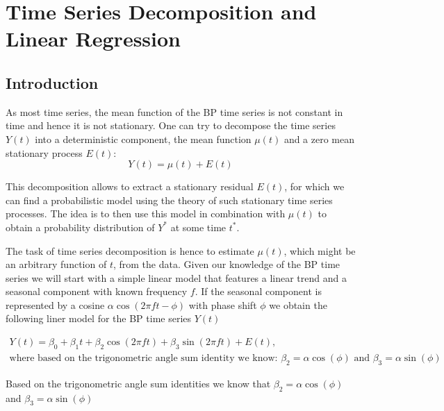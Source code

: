 

\chapter{Time Series Decomposition and Linear Regression}\label{ch:time-series-decomposition-and-regression}


\section{Introduction}

As most time series, the mean function of the BP time series is not constant in time and hence it is not stationary.
One can try to decompose the time series $Y(t)$ into a deterministic component, the mean function $\mu(t)$
and a zero mean stationary process $E(t)$:
\[ Y(t)= \mu(t) + E(t) \]

This decomposition allows to extract a stationary residual $E(t)$, for which we can find a probabilistic model
using the theory of such stationary time series processes. The idea is to then use this model in combination
with $\mu(t)$ to obtain a probability distribution of $Y^{\ast}$ at some time $t^{\ast}$.

The task of time series decomposition is hence to estimate $\mu(t)$, which might be an arbitrary function of $t$, from the data.
Given our knowledge of the BP time series we will start with a simple linear model that
features a linear trend and a seasonal component with known frequency $f$.
If the seasonal component is represented by a cosine $\alpha \cos(2 \pi f t - \phi)$ with phase shift $\phi$ we obtain the
following liner model for the BP time series $Y(t)$

\begin{gather*}
Y(t) = \beta_0 + \beta_1 t + \beta_2 \cos(2 \pi f t) + \beta_3 \sin(2 \pi f t) + E(t), \\
\text{where based on the trigonometric angle sum identity we know: $\beta_2 = \alpha \cos(\phi)$ and $\beta_3 = \alpha \sin(\phi)$}
\end{gather*}

Based on the trigonometric angle sum identities we know that $\beta_2 = \alpha \cos(\phi)$ and $\beta_3 = \alpha \sin(\phi)$

